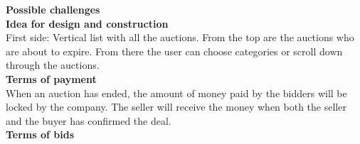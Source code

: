 \textbf{Possible challenges}\\

\textbf{Idea for design and construction}\\
First side: Vertical list with all the auctions. From the top are the auctions who are about to expire. From there the user can choose categories or scroll down through the auctions.\\

\textbf{Terms of payment}\\
When an auction has ended, the amount of money paid by the bidders will be locked by the company. The seller will receive the money when both the seller and the buyer has confirmed the deal.\\  

\textbf{Terms of bids}\\